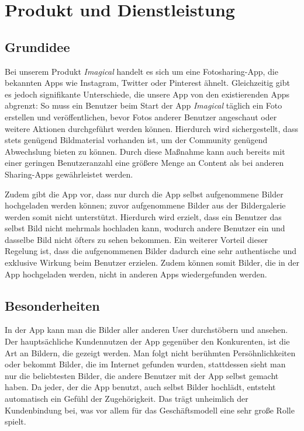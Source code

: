 \chapter{Produkt und Dienstleistung}


\section{Grundidee}

Bei unserem Produkt \textit{Imagical} handelt es sich um eine Fotosharing-App, die bekannten Apps wie Instagram, Twitter oder Pinterest ähnelt. Gleichzeitig gibt es jedoch signifikante Unterschiede, die unsere App von den existierenden Apps abgrenzt:
So muss ein Benutzer beim Start der App \textit{Imagical} täglich ein Foto erstellen und veröffentlichen, bevor Fotos anderer Benutzer angeschaut oder weitere Aktionen durchgeführt werden können. Hierdurch wird sichergestellt, dass stets genügend Bildmaterial vorhanden ist, um der Community genügend Abwechslung bieten zu können. Durch diese Maßnahme kann auch bereits mit einer geringen Benutzeranzahl eine größere Menge an Content als bei anderen Sharing-Apps gewährleistet werden.

Zudem gibt die App vor, dass nur durch die App selbst aufgenommene Bilder hochgeladen werden können; zuvor aufgenommene Bilder aus der Bildergalerie werden somit nicht unterstützt.
Hierdurch wird erzielt, dass ein Benutzer das selbst Bild nicht mehrmals hochladen kann, wodurch andere Benutzer ein und dasselbe Bild nicht öfters zu sehen bekommen.
Ein weiterer Vorteil dieser Regelung ist, dass die aufgenommenen Bilder dadurch eine sehr authentische und exklusive Wirkung beim Benutzer erzielen. Zudem können somit Bilder, die in der App hochgeladen werden, nicht in anderen Apps wiedergefunden werden.

\section{Besonderheiten}

In der App kann man die Bilder aller anderen User durchstöbern und ansehen. Der hauptsächliche Kundennutzen der App gegenüber den Konkurenten, ist die Art an Bildern, die gezeigt werden. Man folgt nicht berühmten Persöhnlichkeiten oder bekommt Bilder, die im Internet gefunden wurden, stattdessen sieht man nur die beliebtesten Bilder, die andere Benutzer mit der App selbst gemacht haben. Da jeder, der die App benutzt, auch selbst Bilder hochlädt, entsteht automatisch ein Gefühl der Zugehörigkeit. Das trägt unheimlich der Kundenbindung bei, was vor allem für das Geschäftsmodell eine sehr große Rolle spielt.

